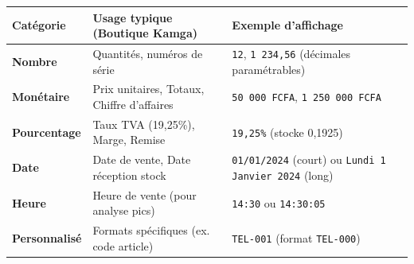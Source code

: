 \documentclass[11pt]{article}
\begin{document}
\begin{propriete}
\begin{center}
\begin{tabularx}{\linewidth}{|l|X|X|}\hline
\rowcolor{popblueL}
\textbf{Catégorie} & \textbf{Usage typique (Boutique Kamga)} & \textbf{Exemple d'affichage} \\\hline
\textbf{Nombre} & Quantités, numéros de série & \texttt{12}, \texttt{1 234,56} (décimales paramétrables) \\\hline
\textbf{Monétaire} & Prix unitaires, Totaux, Chiffre d'affaires & \texttt{50 000 FCFA}, \texttt{1 250 000 FCFA} \\\hline
\textbf{Pourcentage} & Taux TVA (19,25\%), Marge, Remise & \texttt{19,25\%} (stocke 0,1925) \\\hline
\textbf{Date} & Date de vente, Date réception stock & \texttt{01/01/2024} (court) ou \texttt{Lundi 1 Janvier 2024} (long) \\\hline
\textbf{Heure} & Heure de vente (pour analyse pics) & \texttt{14:30} ou \texttt{14:30:05} \\\hline
\textbf{Personnalisé} & Formats spécifiques (ex. code article) & \texttt{TEL-001} (format \texttt{TEL-000}) \\\hline
\end{tabularx}
\end{center}
\end{propriete}
\end{document}
